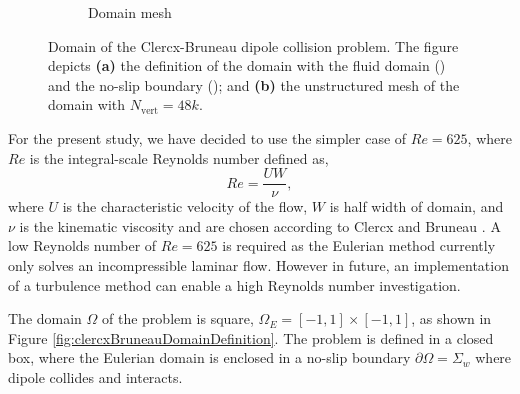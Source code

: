 \begin{figure}[!b]
\begin{subfigure}[t]{0.45\textwidth}
             \caption{Domain mesh}
             \label{fig:clercxBruneauDomainMesh}
     \end{subfigure}
     \caption{Domain of the Clercx-Bruneau dipole collision problem. The figure depicts \textbf{(a)} the definition of the domain with the fluid domain ({}) and the no-slip boundary ({}); and \textbf{(b)} the unstructured mesh of the domain with $N_{\mathrm{vert}} = 48k$.}
     \label{fig:clercxBruneauDomain}
	\end{figure}

For the present study, we have decided to use the simpler case of $Re=625$, where $Re$ is the integral-scale Reynolds number defined as,
	\begin{equation}
	Re = \frac{UW}{\nu},
	\end{equation}
where $U$ is the characteristic velocity of the flow, $W$ is half width of domain, and $\nu$ is the kinematic viscosity and are chosen according to Clercx and Bruneau \cite{Clercx2006a}. A low Reynolds number of $Re=625$ is required as the Eulerian method currently only solves an incompressible laminar flow. However in future, an implementation of a turbulence method can enable a high Reynolds number investigation.

The domain $\Omega$ of the problem is square, $\Omega_E = [-1,1]\times[-1,1]$, as shown in Figure \ref{fig:clercxBruneauDomainDefinition}. The problem is defined in a closed box, where the Eulerian domain is enclosed in a no-slip boundary $\partial{\Omega} = \Sigma_w$ where dipole collides and interacts.

